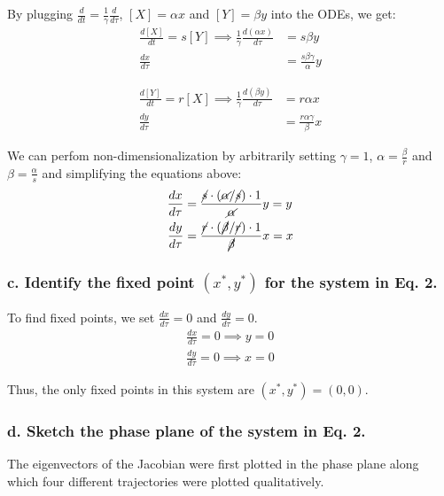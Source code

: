 \documentclass[12pt]{article}
\begin{document}
By plugging $\frac{d}{dt} = \frac{1}{\gamma} \frac{d}{d\tau}$, $[X] = \alpha x$
and $[Y] = \beta y$ into the ODEs, we get:
\begin{equation*}
    \begin{aligned}
        \frac{d [X]}{dt} = s[Y] \implies \frac{1}{\gamma} \frac{d (\alpha x)}{d\tau} & = s \beta y                      \\
        \frac{dx}{d\tau}                                                             & = \frac{s\beta \gamma}{\alpha} y
    \end{aligned}
\end{equation*}

\begin{equation*}
    \begin{aligned}
        \frac{d [Y]}{dt} = r[X] \implies \frac{1}{\gamma} \frac{d (\beta y)}{d\tau} & = r \alpha x                     \\
        \frac{dy}{d\tau}                                                            & = \frac{r\alpha \gamma}{\beta} x
    \end{aligned}
\end{equation*}

\noindent
We can perfom non-dimensionalization by arbitrarily setting $\gamma = 1$,
$\alpha = \frac{\beta}{r}$ and $\beta = \frac{\alpha}{s}$ and simplifying the equations above:
\begin{align*}
    \frac{dx}{d\tau} & = \frac{\cancel{s}\cdot(\cancel{\alpha}/\cancel{s})\cdot1}{\cancel{\alpha}}y = y \\
    \frac{dy}{d\tau} & = \frac{\cancel{r}\cdot(\cancel{\beta}/\cancel{r})\cdot1}{\cancel{\beta}}x = x
\end{align*}

\subsubsection*{c. Identify the fixed point $(x^*,y^*)$ for the system in Eq. 2.}

To find fixed points, we set $\frac{dx}{d\tau} = 0$ and $\frac{dy}{d\tau} = 0$.
\begin{align*}
    \frac{dx}{d\tau} = 0 \implies y = 0 \\
    \frac{dy}{d\tau} = 0 \implies x = 0
\end{align*}

\noindent
Thus, the only fixed points in this system are $(x^*,y^*) = (0,0)$.

\subsubsection*{d. Sketch the phase plane of the system in Eq. 2.}
The eigenvectors of the Jacobian were first plotted in the phase plane along which four different trajectories were plotted qualitatively.
\end{document}
